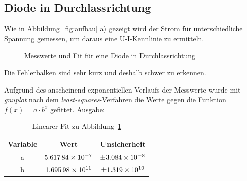 \subsection{Diode in Durchlassrichtung}
Wie in Abbildung~\ref{fig:aufbau} a) gezeigt wird der Strom für unterschiedliche Spannung gemessen, um daraus eine U-I-Kennlinie zu ermitteln.

\begin{figure}[H]
\centering
{}
\caption{Messwerte und Fit für eine Diode in Durchlassrichtung}
\label{fig:diode}
\end{figure}
Die Fehlerbalken sind sehr kurz und deshalb schwer zu erkennen.

Aufgrund des anscheinend exponentiellen Verlaufs der Messwerte wurde mit \emph{gnuplot} nach dem \emph{least-squares}-Verfahren die Werte gegen die Funktion $f(x)=a\cdot b^x$ gefittet. Ausgabe:
\begin{table}[H]
  \centering
  \begin{tabular}{c | c | c }
    Variable  & Wert & Unsicherheit\\ \hline
    a & $\num{5.61784d-7}$ & $\pm\num{3.084d-8}$ \\
    b & $\num{1.69598d+11}$ & $\pm\num{1.319d+10}$
  \end{tabular}
  \caption{Linearer Fit zu Abbildung~\ref{fig:diode}}
  \label{tab:fitdiode}
\end{table}
